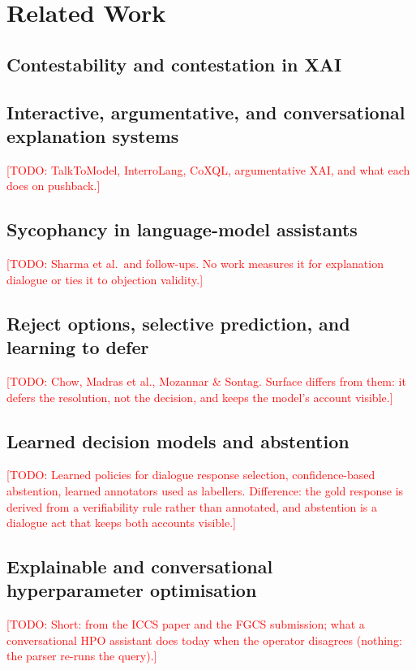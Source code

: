 \documentclass[preprint,12pt,3p,times]{elsarticle}
\newcommand{\todo}[1]{\textcolor{red}{[TODO: #1]}}
\begin{document}
\section{Related Work}
\subsection{Contestability and contestation in XAI}
\subsection{Interactive, argumentative, and conversational explanation systems}
\todo{TalkToModel, InterroLang, CoXQL, argumentative XAI, and what each does on pushback.}
\subsection{Sycophancy in language-model assistants}
\todo{Sharma et al.\ and follow-ups. No work measures it for explanation dialogue or ties it to objection validity.}
\subsection{Reject options, selective prediction, and learning to defer}
\todo{Chow, Madras et al., Mozannar \& Sontag. Surface differs from them: it defers the resolution, not the decision, and keeps the model's account visible.}
\subsection{Learned decision models and abstention}
\todo{Learned policies for dialogue response selection, confidence-based abstention, learned annotators used as labellers. Difference: the gold response is derived from a verifiability rule rather than annotated, and abstention is a dialogue act that keeps both accounts visible.}
\subsection{Explainable and conversational hyperparameter optimisation}
\todo{Short: from the ICCS paper and the FGCS submission; what a conversational HPO assistant does today when the operator disagrees (nothing: the parser re-runs the query).}

\end{document}
